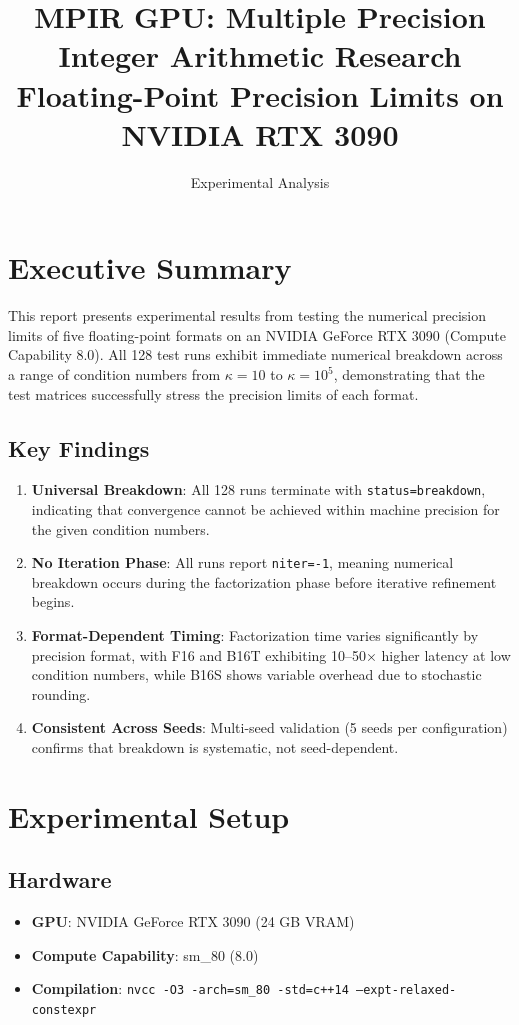 \documentclass[11pt,a4paper]{article}
\title{MPIR GPU: Multiple Precision Integer Arithmetic Research\\
\large Floating-Point Precision Limits on NVIDIA RTX 3090}
\author{Experimental Analysis}
\date{}
\begin{document}
\maketitle

\section{Executive Summary}

This report presents experimental results from testing the numerical precision limits of five floating-point formats on an NVIDIA GeForce RTX 3090 (Compute Capability 8.0). All 128 test runs exhibit immediate numerical breakdown across a range of condition numbers from $\kappa = 10$ to $\kappa = 10^5$, demonstrating that the test matrices successfully stress the precision limits of each format.

\subsection{Key Findings}

\begin{enumerate}
  \item \textbf{Universal Breakdown}: All 128 runs terminate with \texttt{status=breakdown}, indicating that convergence cannot be achieved within machine precision for the given condition numbers.
  \item \textbf{No Iteration Phase}: All runs report \texttt{niter=-1}, meaning numerical breakdown occurs during the factorization phase before iterative refinement begins.
  \item \textbf{Format-Dependent Timing}: Factorization time varies significantly by precision format, with F16 and B16T exhibiting 10--50× higher latency at low condition numbers, while B16S shows variable overhead due to stochastic rounding.
  \item \textbf{Consistent Across Seeds}: Multi-seed validation (5 seeds per configuration) confirms that breakdown is systematic, not seed-dependent.
\end{enumerate}

\section{Experimental Setup}

\subsection{Hardware}
\begin{itemize}
  \item \textbf{GPU}: NVIDIA GeForce RTX 3090 (24 GB VRAM)
  \item \textbf{Compute Capability}: sm\_80 (8.0)
  \item \textbf{Compilation}: \texttt{nvcc -O3 -arch=sm\_80 -std=c++14 --expt-relaxed-constexpr}
\end{itemize}
\end{document}
